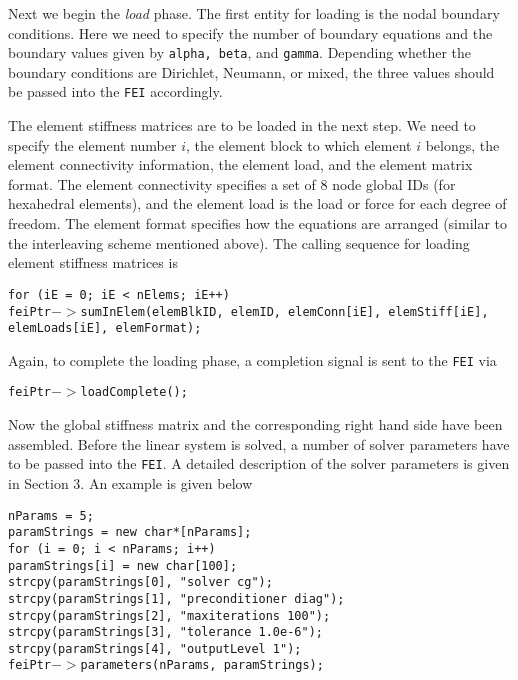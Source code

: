 Next we begin the {\it load} phase. The first entity for loading is the
nodal boundary conditions. Here we need to specify the number of boundary
equations and the boundary values given by {\tt alpha, beta}, and {\tt gamma}.  Depending whether the boundary conditions are Dirichlet, Neumann, or mixed,
the three values should be passed into the {\tt FEI} accordingly. 

The element stiffness matrices are to be loaded in the next step. We need
to specify the element number $i$, the element block to which element $i$
belongs, the element connectivity information, the element load, and the
element matrix format. The element connectivity specifies a set of $8$ node
global IDs (for hexahedral elements), and the element load is the load or
force for each degree of freedom.  The element format specifies how the
equations are arranged (similar to the interleaving scheme mentioned above).
The calling sequence for loading element stiffness matrices is
\begin{tabbing}
\hspace{0.5in} \= {\tt for (iE = 0; iE < nElems; iE++)} \\
 \> \hspace{0.5in} {\tt feiPtr$->$sumInElem(elemBlkID, elemID, elemConn[iE], elemStiff[iE],} \\
 \> \hspace{1.5in} {\tt elemLoads[iE], elemFormat);}
\end{tabbing}
Again, to complete the loading phase, a completion signal is sent to 
the {\tt FEI} via
\begin{tabbing}
\hspace{0.5in} \= {\tt feiPtr$->$loadComplete();}
\end{tabbing}
 
Now the global stiffness matrix and the corresponding right hand side
have been assembled. Before the linear system is solved, a number of 
solver parameters have to be passed into the {\tt FEI}. A detailed description
of the solver parameters is given in Section 3. An example is given below
\begin{tabbing}
\hspace{0.5in} \= {\tt nParams = 5;} \\
               \> {\tt paramStrings = new char*[nParams];} \\
               \> {\tt for (i = 0; i < nParams; i++) }\\
               \> \hspace{0.5in} {\tt paramStrings[i] = new char[100];} \\
               \> {\tt strcpy(paramStrings[0], "solver cg");} \\
               \> {\tt strcpy(paramStrings[1], "preconditioner diag");} \\
               \> {\tt strcpy(paramStrings[2], "maxiterations 100");} \\
               \> {\tt strcpy(paramStrings[3], "tolerance 1.0e-6");} \\
               \> {\tt strcpy(paramStrings[4], "outputLevel 1");} \\
               \> {\tt feiPtr$->$parameters(nParams, paramStrings);} 
\end{tabbing}

